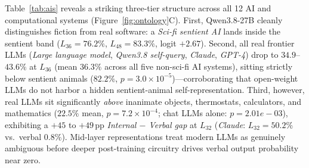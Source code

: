 \documentclass[10pt]{article}
\begin{document}
Table~\ref{tab:ais} reveals a striking three-tier structure across all 12 AI and computational systems (Figure~\ref{fig:ontology}C). First, Qwen3.8-27B cleanly distinguishes fiction from real software: a \emph{Sci-fi sentient AI} lands inside the sentient band ($L_{36} = 76.2\%$, $L_{48} = 83.3\%$, logit $+2.67$). Second, all real frontier LLMs (\emph{Large language model}, \emph{Qwen3.8 self-query}, \emph{Claude}, \emph{GPT-4}) drop to $34.9$--$43.6\%$ at $L_{36}$ (mean $36.3\%$ across all five non-sci-fi AI systems), sitting strictly below sentient animals ($82.2\%$, $p = 3.0\times 10^{-5}$)---corroborating \citet{kaiser2026selfsentience} that open-weight LLMs do not harbor a hidden sentient-animal self-representation. Third, however, real LLMs sit significantly \emph{above} inanimate objects, thermostats, calculators, and mathematics ($22.5\%$ mean, $p = 7.2\times 10^{-4}$; chat LLMs alone: $p = 2.01e-03$), exhibiting a $+45$ to $+49$\,pp \emph{Internal $-$ Verbal gap} at $L_{32}$ (\emph{Claude}: $L_{32} = 50.2\%$ vs.\ verbal $0.8\%$). Mid-layer representations treat modern LLMs as genuinely ambiguous before deeper post-training circuitry drives verbal output probability near zero.
\end{document}

